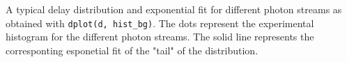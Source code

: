 A typical delay distribution and exponential fit for different photon streams as obtained with \verb|dplot(d, hist_bg)|.
The dots represent the experimental histogram for the different photon streams.
The solid line represents the corresponting esponetial fit of the "tail" of the distribution.